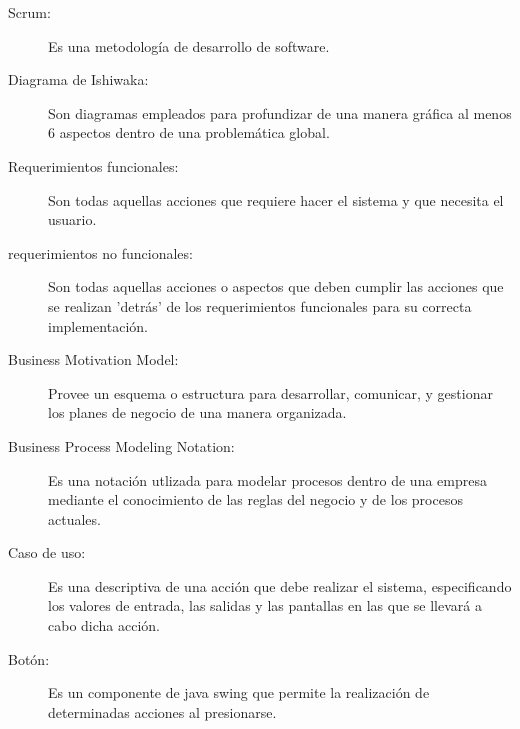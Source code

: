 \begin{description}
	\item[Scrum:] Es una metodología de desarrollo de software.
\end{description}

\begin{description}
	\item[Diagrama de Ishiwaka:] Son diagramas empleados para profundizar de una manera gráfica al menos 6 aspectos dentro de una problemática global.
\end{description}

\begin{description}
	\item[Requerimientos funcionales:] Son todas aquellas acciones que requiere hacer el sistema y que necesita el usuario.
\end{description}

\begin{description}
	\item[requerimientos no funcionales:] Son todas aquellas acciones o aspectos que deben cumplir las acciones que se realizan 'detrás' de los requerimientos funcionales para su correcta implementación.
\end{description}

\begin{description}
	\item[Business Motivation Model:] Provee un esquema o estructura para desarrollar, comunicar, y gestionar los planes de negocio de una manera organizada.
\end{description}

\begin{description}
	\item[Business Process Modeling Notation:] Es una notación utlizada para modelar procesos dentro de una empresa mediante el conocimiento de las reglas del negocio y de los procesos actuales.
\end{description}

\begin{description}
	\item[Caso de uso:] Es una descriptiva de una acción que debe realizar el sistema, especificando los valores de entrada, las salidas y las pantallas en las que se llevará a cabo dicha acción.
\end{description}

\begin{description}
	\item[Botón:] Es un componente de java swing que permite la realización de determinadas acciones al presionarse.
\end{description}

